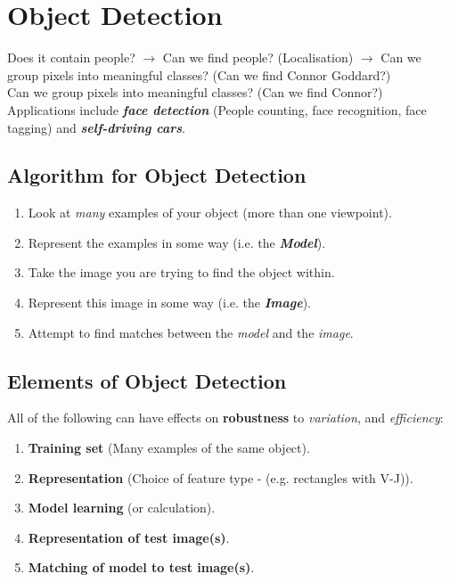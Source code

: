 \documentclass[english, 10pt]{article}
\begin{document}
\section{Object Detection}

Does it contain people? $\rightarrow$ Can we find people? (Localisation) $\rightarrow$ Can we group pixels into meaningful classes? (Can we find Connor Goddard?) \\

Can we group pixels into meaningful classes? (Can we find Connor?) \\

Applications include \textbf{\textit{face detection}} (People counting, face recognition, face tagging) and \textit{\textbf{self-driving cars}}.

\subsection{Algorithm for Object Detection}

\begin{enumerate}
\item Look at \textit{many} examples of your object (more than one viewpoint). 
\item Represent the examples in some way (i.e. the \textit{\textbf{Model}}).
\item Take the image you are trying to find the object within.
\item Represent this image in some way (i.e. the \textit{\textbf{Image}}).
\item Attempt to find matches between the \textit{model} and the \textit{image}.
\end{enumerate}

\subsection{Elements of Object Detection}

All of the following can have effects on \textbf{robustness} to \textit{variation}, and \textit{efficiency}:

\begin{enumerate}
\item \textbf{Training set} (Many examples of the same object). 
\item \textbf{Representation} (Choice of feature type - (e.g. rectangles with V-J)).
\item \textbf{Model learning} (or calculation).
\item \textbf{Representation of test image(s)}.
\item \textbf{Matching of model to test image(s)}.
\end{enumerate}
\end{document}

